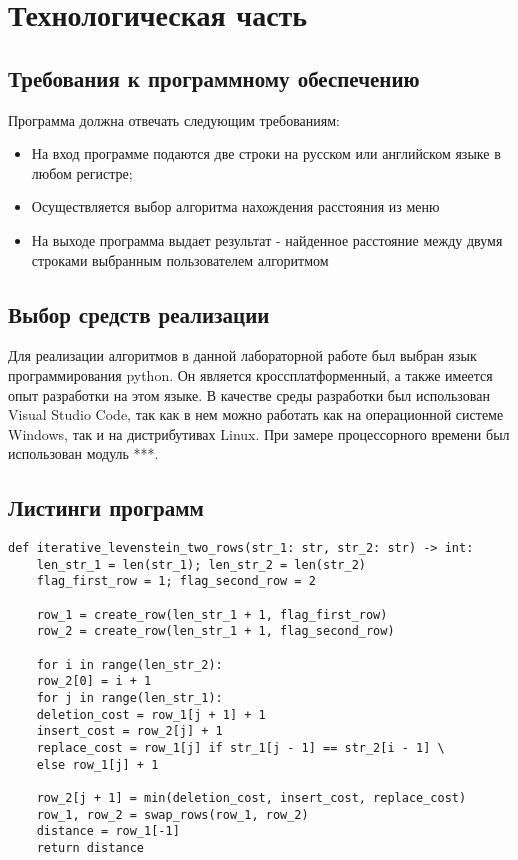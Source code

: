 \chapter{Технологическая часть}
\section{Требования к программному обеспечению}
Программа должна отвечать следующим требованиям:
\begin{itemize}
	\item На вход программе подаются две строки на русском или английском языке в любом регистре;
	\item Осуществляется выбор алгоритма нахождения расстояния из меню
	\item На выходе программа выдает результат - найденное расстояние между двумя строками выбранным пользователем алгоритмом
\end{itemize}

\section{Выбор средств реализации}
Для реализации алгоритмов в данной лабораторной работе был выбран язык программирования python. Он является кроссплатформенный, а также имеется опыт разработки на этом языке. В качестве среды разработки был использован Visual Studio Code, так как в нем можно работать как на операционной системе Windows, так и на дистрибутивах Linux. При замере процессорного времени был использован модуль ***.
\section{Листинги программ}
\begin{lstlisting}[label=some-code,caption=Программный код нахождения расстояния Левенштейна итеративно с использованием двух строк]
	def iterative_levenstein_two_rows(str_1: str, str_2: str) -> int:
	len_str_1 = len(str_1); len_str_2 = len(str_2)
	flag_first_row = 1; flag_second_row = 2
	
	row_1 = create_row(len_str_1 + 1, flag_first_row)
	row_2 = create_row(len_str_1 + 1, flag_second_row)
	
	for i in range(len_str_2):
	row_2[0] = i + 1
	for j in range(len_str_1):
	deletion_cost = row_1[j + 1] + 1
	insert_cost = row_2[j] + 1
	replace_cost = row_1[j] if str_1[j - 1] == str_2[i - 1] \
	else row_1[j] + 1
	
	row_2[j + 1] = min(deletion_cost, insert_cost, replace_cost)
	row_1, row_2 = swap_rows(row_1, row_2)
	distance = row_1[-1]
	return distance
\end{lstlisting}

